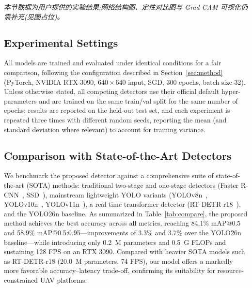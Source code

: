 \documentclass[sensors,article,submit,pdftex,moreauthors]{Definitions/mdpi}
\begin{document}
\textit{本节数据为用户提供的实验结果;网络结构图、定性对比图与 Grad-CAM 可视化仍需补充(见图占位)。}

\subsection{Experimental Settings}

All models are trained and evaluated under identical conditions for a fair comparison, following the configuration described in Section~\ref{sec:method} (PyTorch, NVIDIA RTX 3090, $640\times640$ input, SGD, 300 epochs, batch size 32). Unless otherwise stated, all competing detectors use their official default hyper-parameters and are trained on the same train/val split for the same number of epochs; results are reported on the held-out test set, and each experiment is repeated three times with different random seeds, reporting the mean (and standard deviation where relevant) to account for training variance.

\subsection{Comparison with State-of-the-Art Detectors}

We benchmark the proposed detector against a comprehensive suite of state-of-the-art (SOTA) methods: traditional two-stage and one-stage detectors (Faster R-CNN~\cite{ren2017faster}, SSD~\cite{liu2016ssd}), mainstream lightweight YOLO variants (YOLOv8n~\cite{hussain2023yolo}, YOLOv10n~\cite{wang2024yolov10}, YOLOv11n~\cite{khanam2024yolov11}), a real-time transformer detector (RT-DETR-r18~\cite{zhao2024rtdetr}), and the YOLO26n baseline. As summarized in Table~\ref{tab:compare}, the proposed method achieves the best accuracy across all metrics, reaching 84.1\% mAP@0.5 and 58.9\% mAP@0.5:0.95---improvements of 3.3\% and 3.7\% over the YOLO26n baseline---while introducing only 0.2~M parameters and 0.5~G FLOPs and sustaining 128 FPS on an RTX 3090. Compared with heavier SOTA models such as RT-DETR-r18 (20.0~M parameters, 74 FPS), our model offers a markedly more favorable accuracy--latency trade-off, confirming its suitability for resource-constrained UAV platforms.
\end{document}
